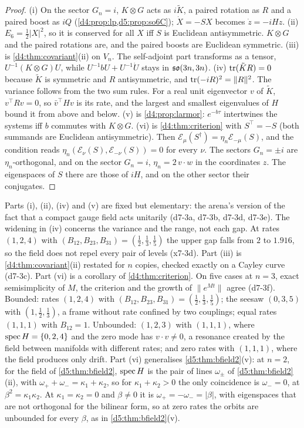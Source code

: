 \begin{proof}
(i) On the sector $G_n=i$, $K\otimes G$ acts as $i\tilde K$, a paired rotation as $R$ and a paired boost as $iQ$ (\cref{d4:prop:lp,d5:prop:so6C}); $\dot X=-SX$ becomes $\dot z=-iHz$. (ii) $E_6=\tfrac12|X|^2$, so it is conserved for all $X$ iff $S$ is Euclidean
antisymmetric. $K\otimes G$ and the paired rotations are, and the paired boosts are Euclidean symmetric. (iii) is
\cref{d4:thm:covariant}(ii) on $V_n$. The self-adjoint part transforms as a tensor, $U^{-1}(K\otimes G)U$, while $U^{-1}bU+U^{-1}\dot U$ stays in
$\mathfrak{so}(3n,3n)$. (iv) $\operatorname{tr}(\tilde KR)=0$ because $\tilde K$ is symmetric and $R$ antisymmetric, and $\operatorname{tr}(-iR)^2=\|R\|^2$. The variance follows from the two sum rules. For a real unit eigenvector $v$ of $\tilde K$, $v^{\top}Rv=0$, so $\bar v^{\top}Hv$ is its rate, and the largest and smallest eigenvalues of $H$ bound it from above and below. (v) is
\cref{d4:prop:larmor}: $e^{-b\tau}$ intertwines the systems iff $b$ commutes with $K\otimes G$. (vi) is \cref{d4:thm:criterion} with
$S^{\!\top}=-S$ (both summands are Euclidean antisymmetric). Then $\mathcal E_\mu(S^\dagger)=\eta_n\mathcal E_{-\mu}(S)$, and the condition reads
$\eta_n(\mathcal E_\nu(S),\mathcal E_{-\nu}(S))=0$ for every $\nu$. The sectors $G_n=\pm i$ are $\eta_n$-orthogonal, and on the sector $G_n=i$,
$\eta_n=2\,v\cdot w$ in the coordinates $z$. The eigenspaces of $S$ there are those of $iH$, and on the other sector their conjugates.
\end{proof}

Parts (i), (ii), (iv) and (v) are fixed but elementary: the arena's version of the fact that a compact gauge field acts unitarily
(d7-3a, d7-3b, d7-3d, d7-3e). The widening in (iv) concerns the variance and the range, not each gap. At rates $(1,2,4)$ with $(B_{12},B_{23},B_{31})=(\tfrac12,\tfrac13,\tfrac15)$ the upper gap falls from $2$ to $1.916$, so the field does not repel every pair of levels (x7-3d). Part (iii) is \cref{d4:thm:covariant}(ii) restated for $n$ copies, checked exactly on a Cayley curve (d7-3c). Part (vi) is
a corollary of \cref{d4:thm:criterion}. On five cases at $n=3$, exact semisimplicity of $M$, the criterion and the growth of $\|e^{Mt}\|$ agree
(d7-3f). Bounded: rates $(1,2,4)$ with $(B_{12},B_{23},B_{31})=(\tfrac12,\tfrac13,\tfrac15)$; the seesaw $(0,3,5)$ with $(1,\tfrac12,\tfrac13)$, a
frame without rate confined by two couplings; equal rates $(1,1,1)$ with $B_{12}=1$. Unbounded: $(1,2,3)$ with $(1,1,1)$, where $\operatorname{spec} H=\{0,2,4\}$ and the
zero mode has $v\cdot v\neq0$, a resonance created by the field between manifolds with different rates; and zero rates with $(1,1,1)$, where
the field produces only drift. Part (vi) generalises \cref{d5:thm:bfield2}(v): at $n=2$, for the field of \cref{d5:thm:bfield2}, $\operatorname{spec} H$ is the pair of lines $\omega_\pm$ of \cref{d5:thm:bfield2}(ii), with $\omega_++\omega_-=\kappa_1+\kappa_2$, so for $\kappa_1+\kappa_2>0$ the only coincidence
is $\omega_-=0$, at $\beta^2=\kappa_1\kappa_2$. At $\kappa_1=\kappa_2=0$ and $\beta\neq0$ it is $\omega_+=-\omega_-=|\beta|$, with eigenspaces that are not
orthogonal for the bilinear form, so at zero rates the orbits are unbounded for every $\beta$, as in \cref{d5:thm:bfield2}(v).

